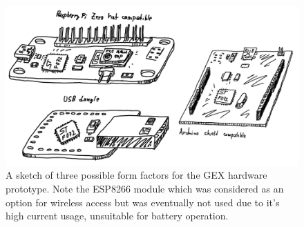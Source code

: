 \begin{figure}
	\centering
	\includegraphics[width=\textwidth] {img/gex-ff-sketches.png}
	\caption[Form factor sketches]{\label{fig:ff-sketches}A sketch of three possible form factors for the GEX hardware prototype. Note the ESP8266 module which was considered as an option for wireless access but was eventually not used due to it's high current usage, unsuitable for battery operation.}
\end{figure}














